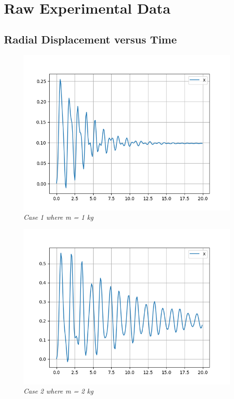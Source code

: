 \chapter{{Raw Experimental Data}}\label{rawexp}
        
    \section{{Radial Displacement versus Time}}
            
        \begin{figure}[H]
            \centering
            \includegraphics{Appendix/RExpPictures/R/rm1.png}
            \caption{\textit{Case 1 where m = 1 kg}}
            \label{}
        \end{figure}
            
        \begin{figure}[H]
            \centering
            \includegraphics{Appendix/RExpPictures/R/rm2.png}
            \caption{\textit{Case 2 where m = 2 kg}}
            \label{}
        \end{figure}
            

